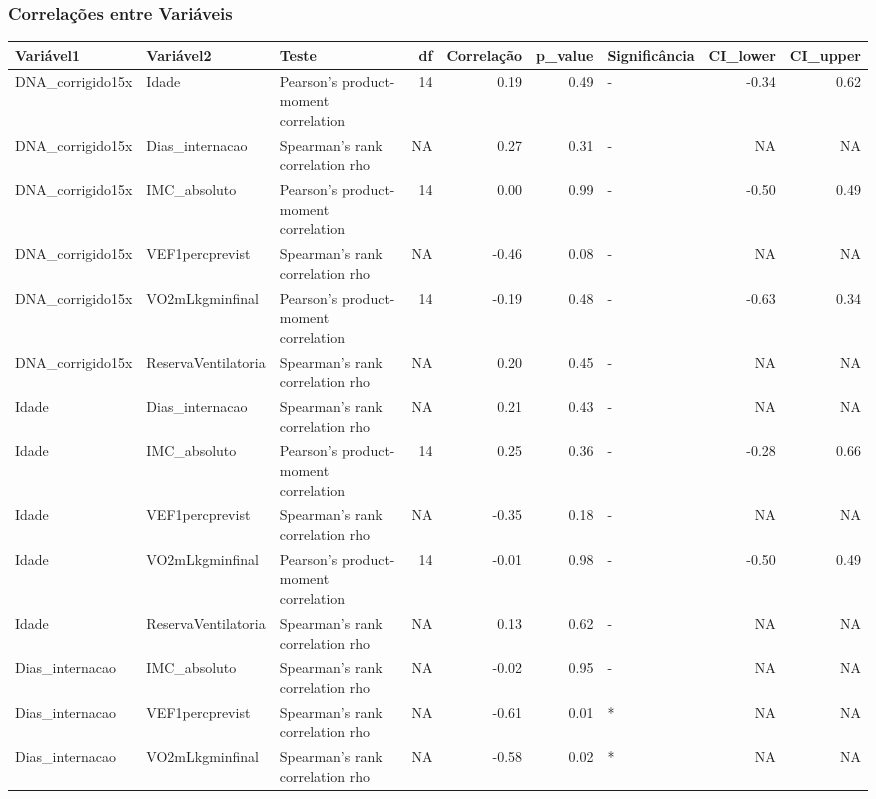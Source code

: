 \documentclass[
]{article}
\begin{document}
\hypertarget{correlauxe7uxf5es-entre-variuxe1veis-1}{%
\subsubsection{Correlações entre
Variáveis}\label{correlauxe7uxf5es-entre-variuxe1veis-1}}

\begin{tabular}{l|l|l|r|r|r|l|r|r}
\hline
Variável1 & Variável2 & Teste & df & Correlação & p\_value & Significância & CI\_lower & CI\_upper\\
\hline
DNA\_corrigido15x & Idade & Pearson's product-moment correlation & 14 & 0.19 & 0.49 & - & -0.34 & 0.62\\
\hline
DNA\_corrigido15x & Dias\_internacao & Spearman's rank correlation rho & NA & 0.27 & 0.31 & - & NA & NA\\
\hline
DNA\_corrigido15x & IMC\_absoluto & Pearson's product-moment correlation & 14 & 0.00 & 0.99 & - & -0.50 & 0.49\\
\hline
DNA\_corrigido15x & VEF1percprevist & Spearman's rank correlation rho & NA & -0.46 & 0.08 & - & NA & NA\\
\hline
DNA\_corrigido15x & VO2mLkgminfinal & Pearson's product-moment correlation & 14 & -0.19 & 0.48 & - & -0.63 & 0.34\\
\hline
DNA\_corrigido15x & ReservaVentilatoria & Spearman's rank correlation rho & NA & 0.20 & 0.45 & - & NA & NA\\
\hline
Idade & Dias\_internacao & Spearman's rank correlation rho & NA & 0.21 & 0.43 & - & NA & NA\\
\hline
Idade & IMC\_absoluto & Pearson's product-moment correlation & 14 & 0.25 & 0.36 & - & -0.28 & 0.66\\
\hline
Idade & VEF1percprevist & Spearman's rank correlation rho & NA & -0.35 & 0.18 & - & NA & NA\\
\hline
Idade & VO2mLkgminfinal & Pearson's product-moment correlation & 14 & -0.01 & 0.98 & - & -0.50 & 0.49\\
\hline
Idade & ReservaVentilatoria & Spearman's rank correlation rho & NA & 0.13 & 0.62 & - & NA & NA\\
\hline
Dias\_internacao & IMC\_absoluto & Spearman's rank correlation rho & NA & -0.02 & 0.95 & - & NA & NA\\
\hline
Dias\_internacao & VEF1percprevist & Spearman's rank correlation rho & NA & -0.61 & 0.01 & * & NA & NA\\
\hline
Dias\_internacao & VO2mLkgminfinal & Spearman's rank correlation rho & NA & -0.58 & 0.02 & * & NA & NA\\

\end{tabular}
\end{document}
